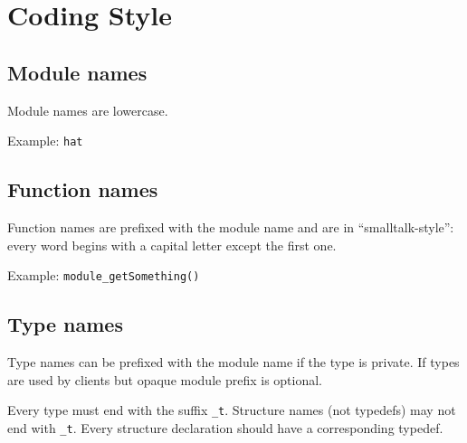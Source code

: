 \chapter{Coding Style}

\section{Module names}

Module names are lowercase.

Example: \texttt{hat}

\section{Function names}

Function names are prefixed with the module name
and are in ``smalltalk-style'': every word begins with
a capital letter except the first one.

Example: \texttt{module\_getSomething()}

\section{Type names}

Type names can be prefixed with the module name
if the type is private. If types are used by clients
but opaque module prefix is optional.

Every type must end with the suffix \texttt{\_t}.
Structure names (not typedefs) may not end with \texttt{\_t}.
Every structure declaration should have a corresponding typedef.
